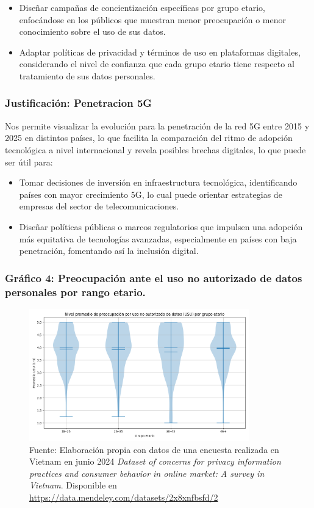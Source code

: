 \documentclass[12pt, a4paper]{article}
\begin{document}
\begin{itemize}
    \item Diseñar campañas de concientización específicas por grupo etario, enfocándose en los públicos que muestran menor preocupación o menor conocimiento sobre el uso de sus datos.
    \item Adaptar políticas de privacidad y términos de uso en plataformas digitales, considerando el nivel de confianza que cada grupo etario tiene respecto al tratamiento de sus datos personales.
\end{itemize}

\subsubsection*{Justificación: Penetracion 5G}
Nos permite visualizar la evolución para la penetración de la red 5G entre 2015 y 2025 en distintos países, lo que facilita la comparación del ritmo de adopción tecnológica a nivel internacional y revela posibles brechas digitales, lo que puede ser útil para:
\begin{itemize}
    \item Tomar decisiones de inversión en infraestructura tecnológica, identificando países con mayor crecimiento 5G, lo cual puede orientar estrategias de empresas del sector de telecomunicaciones.
    \item Diseñar políticas públicas o marcos regulatorios que impulsen una adopción más equitativa de tecnologías avanzadas, especialmente en países con baja penetración, fomentando así la inclusión digital.
\end{itemize}

\subsubsection*{Gráfico 4: Preocupación ante el uso no autorizado de datos personales por rango etario.}
\begin{figure}[H]
    \centering
    \includegraphics[width=0.85\textwidth]{images/violin_preocupacion.png}
    \caption{
        Fuente: Elaboración propia con datos de una encuesta realizada en Vietnam en junio 2024
        \textit{Dataset of concerns for privacy information practices and consumer behavior in online market: A survey in Vietnam}. 
        Disponible en \url{https://data.mendeley.com/datasets/2x8xnfbsfd/2}
    }
\end{figure}
\end{document}
